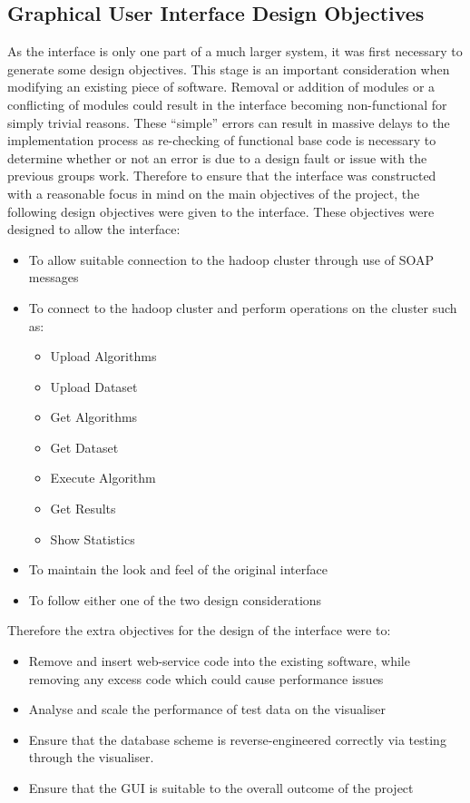 \subsection{Graphical User Interface Design Objectives}
As the interface is only one part of a much larger system, it was first necessary to generate some design objectives. This stage is an important consideration when modifying an existing piece of software. Removal or addition of modules or a conflicting of modules could result in the interface becoming non-functional for simply trivial reasons. These ``simple'' errors can result in massive delays to the implementation process as re-checking of functional base code is necessary to determine whether or not an error is due to a design fault or issue with the previous groups work. Therefore to ensure that the interface was constructed with a reasonable focus in mind on the main objectives of the project, the following design objectives were given to the interface. These objectives were designed to allow the interface: 

\begin{itemize}
	\item To allow suitable connection to the hadoop cluster through use of SOAP messages
	
	\item To connect to the hadoop cluster and perform operations on the cluster such as:
	\begin{itemize}
		\item Upload Algorithms
		\item Upload Dataset
		\item Get Algorithms
		\item Get Dataset
		\item Execute Algorithm
		\item Get Results
		\item Show Statistics
	\end{itemize}
	
	\item To maintain the look and feel of the original interface
	
	\item To follow either one of the two design considerations
\end{itemize}

Therefore the extra objectives for the design of the interface were to:
\begin{itemize}
	\item Remove and insert web-service code into the existing software, while removing any excess code which could cause performance issues
	
	\item Analyse and scale the performance of test data on the visualiser
	
	\item Ensure that the database scheme is reverse-engineered correctly via testing through the visualiser.
	
	\item Ensure that the GUI is suitable to the overall outcome of the project
\end{itemize}

